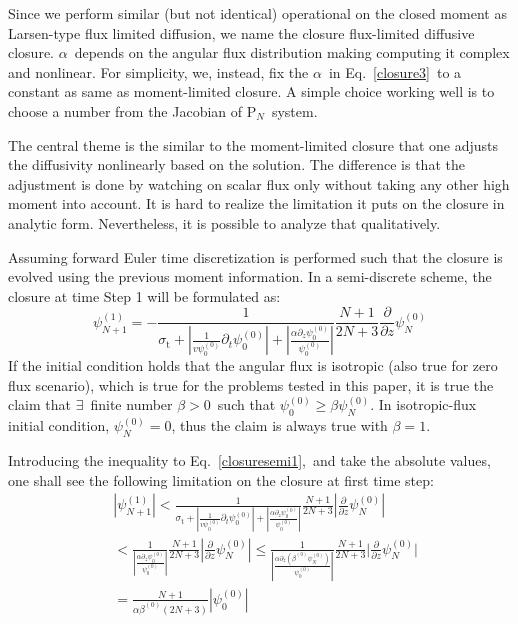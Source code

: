 \documentclass[review]{elsarticle}
\newcommand{\pn}{P$_N$}
\newcommand{\ppz}{\frac{\partial}{\partial z}}
\newcommand{\psii}[1]{\psi_\ensuremath{{#1}}}
\begin{document}
Since we perform similar (but not identical) operational on the closed moment as Larsen-type flux limited diffusion, we name the closure flux-limited diffusive closure. $\alpha$~depends on the angular flux distribution making computing it complex and nonlinear. For simplicity,
we, instead, fix the $\alpha$~in Eq.~\eqref{closure3}~to a constant as same as moment-limited closure. A simple choice working well is to choose a number from the Jacobian of \pn~system.

The central theme is the similar to the moment-limited closure that one adjusts the diffusivity nonlinearly based on the solution. The difference is that the adjustment is done by watching on scalar flux only without taking any other high moment into account. It is hard to realize the limitation it puts on the closure in analytic form. Nevertheless, it is possible to analyze that qualitatively.

Assuming forward Euler time discretization is performed such that the closure is evolved using the previous moment information. In a semi-discrete scheme, the closure at time Step 1 will be formulated as:
\begin{equation}\label{closuresemi1}
\psii{N+1}^{(1)}=-\frac{1}{\sigma_\mathrm{t}+\displaystyle|\frac{1}{v\psii{0}^{(0)}}\partial_t\psii{0}^{(0)}|+|\frac{\alpha\partial_z\psii{0}^{(0)}}{\psii{0}^{(0)}}|}\frac{N+1}{2N+3}\ppz\psii{N}^{(0)}
\end{equation}
If the initial condition holds that the angular flux is isotropic (also true for zero flux scenario), which is true for the problems tested in this paper, it is true the claim that $\exists$~finite number $\beta>0$~such that $\psii{0}^{(0)}\geq\beta\psii{N}^{(0)}$. In isotropic-flux initial condition, $\psii{N}^{(0)}=0$, thus the claim is always true with $\beta=1$.

Introducing the inequality to Eq.~\eqref{closuresemi1},~and take the absolute values, one shall see the following limitation on the closure at first time step:
\begin{align}\label{closuresemi2}
&|\psii{N+1}^{(1)}|<\frac{1}{\sigma_\mathrm{t}+\displaystyle|\frac{1}{v\psii{0}^{(0)}}\partial_t\psii{0}^{(0)}|+|\frac{\alpha\partial_z\psii{0}^{(0)}}{\psii{0}^{(0)}}|}\frac{N+1}{2N+3}|\ppz\psii{N}^{(0)}|\\\nonumber
&<\frac{1}{\displaystyle|\frac{\alpha\partial_z\psii{0}^{(0)}}{\psii{0}^{(0)}}|}\frac{N+1}{2N+3}|\ppz\psii{N}^{(0)}|\leq\frac{1}{\displaystyle|\frac{\alpha\partial_z\left(\beta^{(0)}\psii{N}^{(0)}\right)}{\psii{0}^{(0)}}|}\frac{N+1}{2N+3}\lvert\ppz\psii{N}^{(0)}\rvert\\\nonumber
&=\frac{N+1}{\alpha\beta^{(0)}(2N+3)}|\psii{0}^{(0)}|
\end{align}
\end{document}
